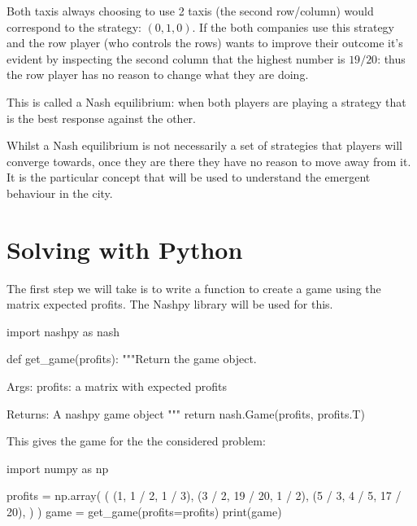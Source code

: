 Both taxis always choosing to use 2 taxis (the second row/column) would
correspond to the strategy: \((0, 1, 0)\).
If the both companies use this strategy and the row player (who controls the
rows) wants to improve their outcome it's evident by inspecting the second
column that the highest number is \(19 / 20\): thus the row player has no reason
to change what they are doing.

This is called a Nash equilibrium: when both players are playing a
strategy that is the best response against the other.

Whilst a Nash equilibrium is not necessarily a set of strategies that players
will converge towards, once they are there they have no reason to move away from
it. It is the particular concept that will be used to understand the emergent
behaviour in the city.



\section{Solving with Python}\label{sec:solving-with-python}

The first step we will take is to write a function to create a game using the
matrix expected profits. The Nashpy library will be used for this.

\begin{pyin}
import nashpy as nash


def get_game(profits):
    """Return the game object.

    Args:
        profits: a matrix with expected profits

    Returns:
        A nashpy game object
    """
    return nash.Game(profits, profits.T)
\end{pyin}

This gives the game for the the considered problem:

\begin{pyin}
import numpy as np

profits = np.array(
    (
        (1, 1 / 2, 1 / 3),
        (3 / 2, 19 / 20, 1 / 2),
        (5 / 3, 4 / 5, 17 / 20),
    )
)
game = get_game(profits=profits)
print(game)
\end{pyin}

